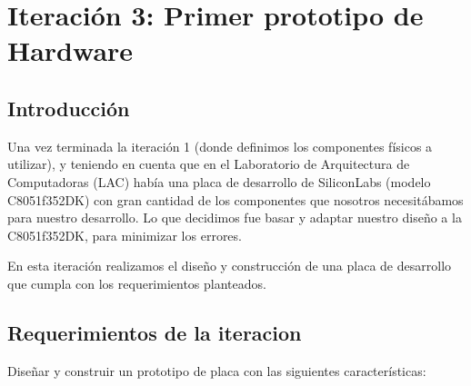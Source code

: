 \chapter{Iteración 3: Primer prototipo de Hardware} %
\label{cha:iteracion_3}


\section{Introducción} %
\label{sec:introduccion}

Una vez terminada la iteración 1 (donde definimos los componentes físicos a utilizar), y teniendo en cuenta que en el Laboratorio de Arquitectura de Computadoras (LAC) había una placa de desarrollo de SiliconLabs (modelo C8051f352DK) con gran cantidad de los componentes que nosotros necesitábamos para nuestro desarrollo. Lo que decidimos fue basar y adaptar nuestro diseño a la C8051f352DK, para minimizar los errores.

En esta iteración realizamos el diseño y construcción de una placa de desarrollo que cumpla con los requerimientos planteados.




\section{Requerimientos de la iteracion} %
\label{sec:requerimientos_de_la_iteracion}

Diseñar y construir un prototipo de placa con las siguientes características:

